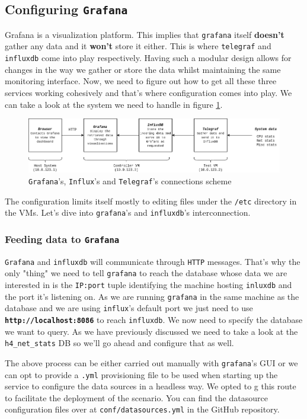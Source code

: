 \documentclass[12pt]{article}
\newcommand{\newpar} {
    \vskip 1cm
}
\begin{document}
	\subsection{Configuring \texttt{Grafana}}
		Grafana is a visualization platform. This implies that \texttt{grafana} itself \textbf{doesn't} gather any data and it \textbf{won't} store it either. This is where \texttt{telegraf} and \texttt{influxdb} come into play respectively. Having such a modular design allows for changes in the way we gather or store the data whilst maintaining the same monitoring interface. Now, we need to figure out how to get all these three services working cohesively and that's where configuration comes into play. We can take a look at the system we need to handle in figure \ref{f:g_i_t}.

		\begin{figure}
			\centering
			\includegraphics[width=\linewidth]{g_i_t.png}
			\caption{\texttt{Grafana}'s, \texttt{Influx}'s and \texttt{Telegraf}'s connections scheme}
			\label{f:g_i_t}
		\end{figure}

		The configuration limits itself mostly to editing files under the \texttt{/etc} directory in the VMs. Let's dive into \texttt{grafana}'s and \texttt{influxdb}'s interconnection.

		\subsubsection{Feeding data to \texttt{Grafana}}
			\texttt{Grafana} and \texttt{influxdb} will communicate through \texttt{HTTP} messages. That's why the only "thing" we need to tell \texttt{grafana} to reach the database whose data we are interested in is the \texttt{IP:port} tuple identifying the machine hosting \texttt{inluxdb} and the port it's listening on. As we are running \texttt{grafana} in the same machine as the database and we are using \texttt{influx}'s default port we just need to use \textbf{\texttt{http://localhost:8086}} to reach \texttt{influxdb}. We now need to specify the database we want to query. As we have previously discussed we need to take a look at the \texttt{h4_net_stats} DB so we'll go ahead and configure that as well.
			\newpar
			The above process can be either carried out manually with \texttt{grafana}'s GUI or we can opt to provide a \texttt{.yml} provisioning file to be used when starting up the service to configure the data sources in a headless way. We opted to g this route to facilitate the deployment of the scenario. You can find the datasource configuration files over at \texttt{conf/datasources.yml} in the GitHub repository.
\end{document}
